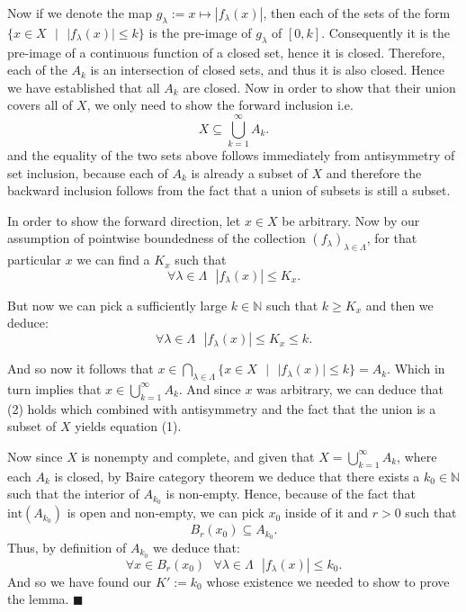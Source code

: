 \documentclass[11pt]{article}
\newcommand\st{\text{ } | \text{ }}
\newcommand\N{\mathbb{N}}
\newcommand\sep{\text{ }}
\begin{document}
 Now if we denote the map $g_\lambda := x \mapsto |f_\lambda(x)| $, then each of the
 sets of the form $\lbrace x \in X \st |f_\lambda(x)| \le k\rbrace$ is the
 pre-image of  $g_\lambda$ of  $[0, k]$. Consequently it is the pre-image of a
 continuous function of a closed set, hence it is closed. Therefore, each of the
 $A_k$ is an intersection of closed sets, and thus it is also closed.
 Hence we have established that all  $A_k$ are closed. Now in order to show that
 their union covers all of  $X$, we only need to show the forward inclusion
 i.e.
 \begin{equation}
    X \subseteq \bigcup_{k = 1}^\infty A_k
  .\end{equation}
 and the equality of the two sets above follows immediately from antisymmetry of set inclusion,
 because each of $A_k$ is already a subset of  $X$ and therefore the backward inclusion follows
 from the fact that a union of subsets is still a subset.

 In order to show the forward direction, let $x \in X$ be arbitrary. Now by our assumption
 of pointwise boundedness of the collection  $\left( f_\lambda \right)_{\lambda \in \Lambda} $,
for that particular $x$ we can find a  $K_x$ such that
$$\forall \lambda \in \Lambda \sep |f_\lambda\left( x \right)| \le K_x. $$

But now we can pick a sufficiently large $k \in \N$ such that  $k \ge K_x$ and then
we deduce:
\[
\forall \lambda \in \Lambda \sep |f_\lambda(x)| \le K_x \le k
.\]

And so now it follows that $x \in \bigcap_{\lambda \in \Lambda}\lbrace x \in X \st
|f_\lambda(x)| \le k \rbrace = A_k$. Which in turn implies that $x \in \bigcup_{k = 1}^\infty A_k$.
And since  $x$ was arbitrary, we can deduce that (2) holds which combined with
antisymmetry and the fact that the union is a subset of $X$ yields equation (1).

Now since $X$ is nonempty and complete, and given that  $X = \bigcup_{k = 1}^\infty A_k$, where
each  $A_k$ is closed, by Baire category theorem we deduce that there exists a
$k_0 \in \N$ such that the interior of  $A_{k_0}$ is non-empty.
Hence, because of the fact that $\text{int}(A_{k_0})$ is open and non-empty, we can pick
$x_0$ inside of it and  $r > 0$ such that
 \[
   B_r(x_0) \subseteq A_{k_0}
.\]
Thus, by definition of $A_{k_0}$ we deduce that:
 \[
 \forall x \in B_r(x_0) \sep \forall \lambda \in \Lambda \sep |f_\lambda(x)| \le k_0
.\]
And so we have found our $K' := k_0$ whose existence we needed to show to prove
the lemma. \hfill $\blacksquare$
\end{document}
